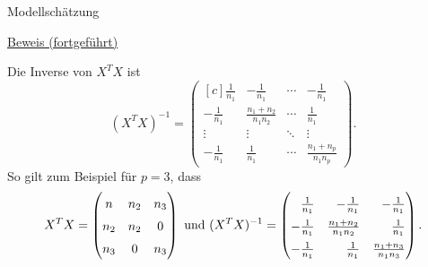 \documentclass[
  8pt,
  ignorenonframetext,
]{beamer}
\begin{document}
\begin{frame}{Modellschätzung}
\protect\hypertarget{modellschuxe4tzung-2}{}
\footnotesize

\underline{Beweis (fortgeführt)}

Die Inverse von \(X^TX\) ist \begin{equation}
\renewcommand{\arraystretch}{1.5}
(X^TX)^{-1} =
\begin{pmatrix*}[c]
   \frac{1}{n_1}
& -\frac{1}{n_1}
& \cdots
& -\frac{1}{n_1}
\\
  -\frac{1}{n_1}
& \frac{n_1+n_2}{n_1 n_2}
& \cdots
& \frac{1}{n_1}
\\
  \vdots
& \vdots
& \ddots
& \vdots
\\
 -\frac{1}{n_1}
& \frac{1}{n_1}
& \cdots
& \frac{n_1+n_p}{n_1 n_p}
\end{pmatrix*}.
\end{equation} So gilt zum Beispiel für \(p = 3\), dass \begin{equation}
X^T X
=
\begin{pmatrix}
n       & n_2   & n_3           \\
n_2     & n_2   & 0             \\
n_3     & 0         & n_3           \\
\end{pmatrix}
\mbox{ und }
\renewcommand{\arraystretch}{1.5}
(X^TX)^{-1} =
\begin{pmatrix*}[r]
   \frac{1}{n_1}
& -\frac{1}{n_1}
& -\frac{1}{n_1}
\\
  -\frac{1}{n_1}
& \frac{n_1+n_2}{n_1 n_2}
& \frac{1}{n_1}
\\
  -\frac{1}{n_1}
& \frac{1}{n_1}
& \frac{n_1+n_3}{n_1 n_3}
\end{pmatrix*}.
\end{equation}
\end{frame}
\end{document}
